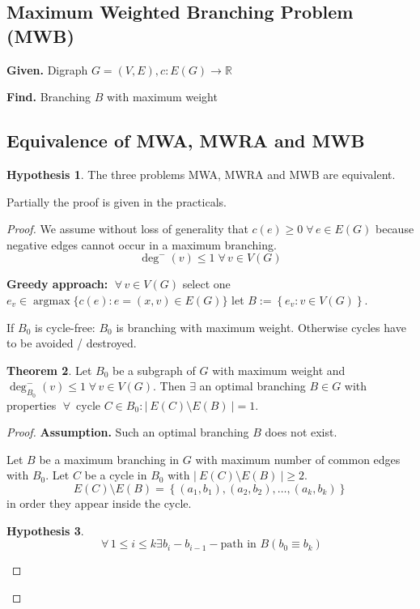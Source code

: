 \documentclass[a4paper]{article}
\theoremstyle{definition}
\newtheorem{theorem}{Theorem}
\newtheorem{hypothesis}[theorem]{Hypothesis}
\newcommand{\card}[1]{\left|\:\!#1\:\!\right|}
\newcommand{\set}[1]{\left\{#1\right\}}
\newcommand{\given}[1]{\textbf{Given.} #1\par}
\newcommand{\find}[1]{\textbf{Find.} #1\par}
\newcommand{\fall}{\;\forall\,}
\DeclareMathOperator{\argmax}{argmax}
\begin{document}
\subsection{Maximum Weighted Branching Problem (MWB)}
%
\given{Digraph $G = (V, E), c: E(G) \rightarrow \mathbb{R}$}
\find{Branching $B$ with maximum weight}
%
\subsection{Equivalence of MWA, MWRA and MWB}
%
\begin{hypothesis}
  The three problems MWA, MWRA and MWB are equivalent.
\end{hypothesis}

Partially the proof is given in the practicals.

\begin{proof}
We assume without loss of generality that $c(e) \geq 0 \fall e \in E(G)$ because negative edges cannot occur in a maximum branching.
\[
    \deg^-(v) \leq 1 \fall v \in V(G)
\]

\textbf{Greedy approach:} $\fall v \in V(G)$ select one $e_v \in \argmax\{c(e): e = (x, v) \in E(G)\}$ let $B := \set{e_v: v \in V(G)}$.

If $B_0$ is cycle-free: $B_0$ is branching with maximum weight. Otherwise cycles have to be avoided / destroyed.

\begin{theorem}\label{lemma-2.10}
  Let $B_0$ be a subgraph of $G$ with maximum weight and $\deg^-_{B_0}(v) \leq 1 \fall v \in V(G)$.
  Then $\exists$ an optimal branching $B \in G$ with properties $\fall$ cycle $C \in B_0: \card{E(C) \setminus E(B)} = 1$.
\end{theorem}

\begin{proof}
\textbf{Assumption.}
  Such an optimal branching $B$ does not exist.

Let $B$ be a maximum branching in $G$ with maximum number of common edges with $B_0$. Let $C$ be a cycle in $B_0$ with $\card{E(C) \setminus E(B)} \geq 2$.
\[
  E(C) \setminus E(B) = \set{(a_1, b_1), (a_2, b_2), \ldots, (a_k, b_k)}
\]
in order they appear inside the cycle.

\begin{hypothesis}
  \[
    \fall 1 \leq i \leq k \exists b_i-b_{i-1}-\text{path in } B (b_0 \equiv b_k)
  \]
\end{hypothesis}


\end{proof}
\end{proof}
\end{document}
